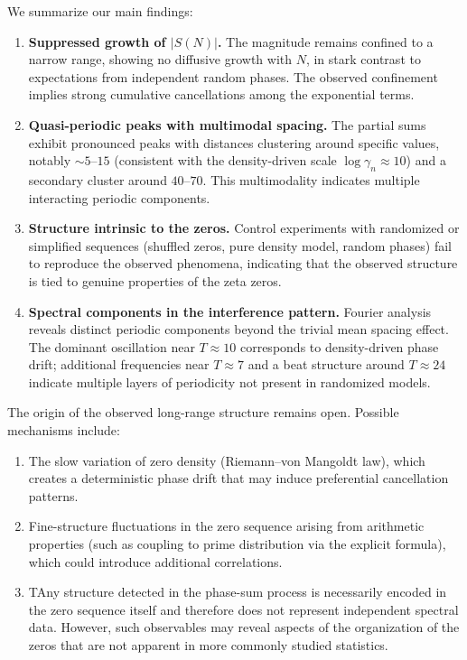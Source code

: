 \documentclass[11pt]{amsart}
\begin{document}
We summarize our main findings:

\begin{enumerate}
\item \textbf{Suppressed growth of $|S(N)|$.}  
The magnitude remains confined to a narrow range, showing no diffusive growth with $N$, in stark contrast to expectations from independent random phases. 
The observed confinement implies strong cumulative cancellations among the exponential terms.

\item \textbf{Quasi-periodic peaks with multimodal spacing.}  
The partial sums exhibit pronounced peaks with distances clustering around specific values, notably $\sim 5$--$15$ (consistent with the density-driven scale $\log \gamma_n \approx 10$) and a secondary cluster around $40$--$70$. 
This multimodality indicates multiple interacting periodic components.

\item \textbf{Structure intrinsic to the zeros.}  
Control experiments with randomized or simplified sequences (shuffled zeros, pure density model, random phases) fail to reproduce the observed phenomena, indicating that the observed structure is tied to genuine properties of the zeta zeros.

\item \textbf{Spectral components in the interference pattern.}  
Fourier analysis reveals distinct periodic components beyond the trivial mean spacing effect. 
The dominant oscillation near $T\approx 10$ corresponds to density-driven phase drift; additional frequencies near $T\approx 7$ and a beat structure around $T\approx 24$ indicate multiple layers of periodicity not present in randomized models.

\end{enumerate}

The origin of the observed long-range structure remains open. Possible mechanisms include:
\begin{enumerate}
\item The slow variation of zero density (Riemann--von Mangoldt law), which creates a deterministic phase drift that may induce preferential cancellation patterns.
\item Fine-structure fluctuations in the zero sequence arising from arithmetic properties (such as coupling to prime distribution via the explicit formula), which could introduce additional correlations.
\item TAny structure detected in the phase-sum process is necessarily encoded in the
zero sequence itself and therefore does not represent independent spectral
data. However, such observables may reveal aspects of the organization of the
zeros that are not apparent in more commonly studied statistics.
\end{enumerate}
\end{document}
